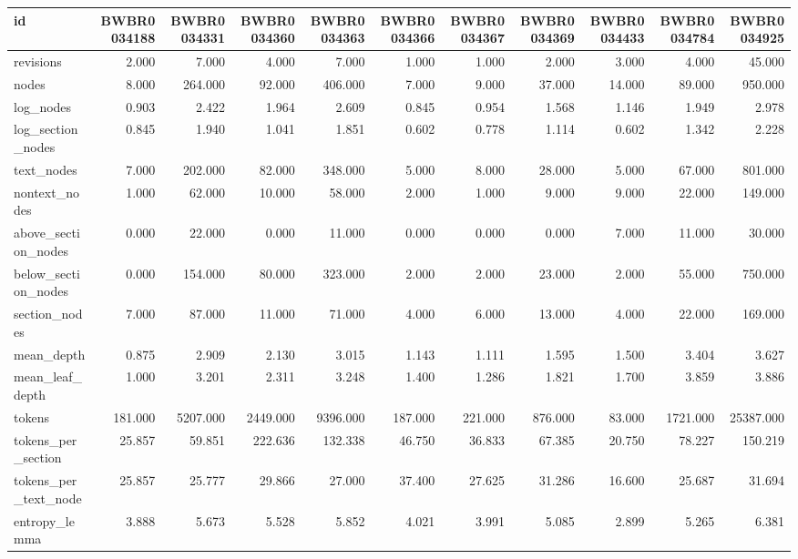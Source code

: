 \begin{tabular}{lrrrrrrrrrr}
\toprule
id & BWBR0034188 & BWBR0034331 & BWBR0034360 & BWBR0034363 & BWBR0034366 & BWBR0034367 & BWBR0034369 & BWBR0034433 & BWBR0034784 & BWBR0034925 \\
\midrule
revisions & 2.000 & 7.000 & 4.000 & 7.000 & 1.000 & 1.000 & 2.000 & 3.000 & 4.000 & 45.000 \\
\cline{1-11}
nodes & 8.000 & 264.000 & 92.000 & 406.000 & 7.000 & 9.000 & 37.000 & 14.000 & 89.000 & 950.000 \\
\cline{1-11}
log\_nodes & 0.903 & 2.422 & 1.964 & 2.609 & 0.845 & 0.954 & 1.568 & 1.146 & 1.949 & 2.978 \\
\cline{1-11}
log\_section\_nodes & 0.845 & 1.940 & 1.041 & 1.851 & 0.602 & 0.778 & 1.114 & 0.602 & 1.342 & 2.228 \\
\cline{1-11}
text\_nodes & 7.000 & 202.000 & 82.000 & 348.000 & 5.000 & 8.000 & 28.000 & 5.000 & 67.000 & 801.000 \\
\cline{1-11}
nontext\_nodes & 1.000 & 62.000 & 10.000 & 58.000 & 2.000 & 1.000 & 9.000 & 9.000 & 22.000 & 149.000 \\
\cline{1-11}
above\_section\_nodes & 0.000 & 22.000 & 0.000 & 11.000 & 0.000 & 0.000 & 0.000 & 7.000 & 11.000 & 30.000 \\
\cline{1-11}
below\_section\_nodes & 0.000 & 154.000 & 80.000 & 323.000 & 2.000 & 2.000 & 23.000 & 2.000 & 55.000 & 750.000 \\
\cline{1-11}
section\_nodes & 7.000 & 87.000 & 11.000 & 71.000 & 4.000 & 6.000 & 13.000 & 4.000 & 22.000 & 169.000 \\
\cline{1-11}
mean\_depth & 0.875 & 2.909 & 2.130 & 3.015 & 1.143 & 1.111 & 1.595 & 1.500 & 3.404 & 3.627 \\
\cline{1-11}
mean\_leaf\_depth & 1.000 & 3.201 & 2.311 & 3.248 & 1.400 & 1.286 & 1.821 & 1.700 & 3.859 & 3.886 \\
\cline{1-11}
tokens & 181.000 & 5207.000 & 2449.000 & 9396.000 & 187.000 & 221.000 & 876.000 & 83.000 & 1721.000 & 25387.000 \\
\cline{1-11}
tokens\_per\_section & 25.857 & 59.851 & 222.636 & 132.338 & 46.750 & 36.833 & 67.385 & 20.750 & 78.227 & 150.219 \\
\cline{1-11}
tokens\_per\_text\_node & 25.857 & 25.777 & 29.866 & 27.000 & 37.400 & 27.625 & 31.286 & 16.600 & 25.687 & 31.694 \\
\cline{1-11}
entropy\_lemma & 3.888 & 5.673 & 5.528 & 5.852 & 4.021 & 3.991 & 5.085 & 2.899 & 5.265 & 6.381 \\

\end{tabular}
